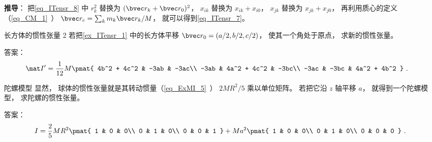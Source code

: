 \textbf{推导}： 
把\autoref{eq_ITensr_8} 中 $r_k^2$ 替换为 $(\bvec r_k + \bvec r_0)^2$， $x_{ik}$ 替换为 $x_{ik} + x_{i0}$， $x_{jk}$ 替换为 $x_{jk} + x_{j0}$， 再利用质心的定义（\autoref{eq_CM_1}~） $\bvec r_c = \sum_k m_k\bvec r_k/M$， 就可以得到\autoref{eq_ITensr_7}。

\begin{exercise}{长方体的惯性张量 2}
若把\autoref{ex_ITensr_1} 中的长方体平移 $\bvec r_0 = (a/2, b/2, c/2)$， 使其一个角处于原点， 求新的惯性张量。

答案：
\begin{equation}
\begin{aligned}
\mat I' &= \frac{1}{12} M
\pmat{
   4b^2 + 4c^2 & -3ab & -3ac\\
   -3ab & 4a^2 + 4c^2 & -3bc\\
   -3ac & -3bc & 4a^2 + 4b^2
}~.
\end{aligned}
\end{equation}
\end{exercise}
\begin{exercise}{陀螺模型}\label{exe_ITensr_2}
显然， 球体的惯性张量就是其转动惯量（\autoref{eq_ExMI_5}~） $2MR^2/5$ 乘以单位矩阵。 若把它沿 $z$ 轴平移 $a$， 就得到一个陀螺模型， 求陀螺的惯性张量。

答案：
\begin{equation}
I = \frac{2}{5}MR^2\pmat{
   1 & 0 & 0\\
   0 & 1 & 0\\
   0 & 0 & 1
} + Ma^2 \pmat{
   1 & 0 & 0\\
   0 & 1 & 0\\
   0 & 0 & 0
}~.\end{equation}
\end{exercise}

